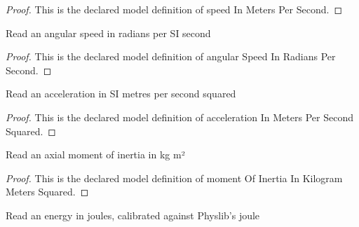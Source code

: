 \begin{proof}
  This is the declared model definition of speed In Meters Per Second.
\end{proof}
\begin{definition}
  \label{def:physics:phyx-mini-0770:phyxminiproblems-problemphyxmini0770-angularspeedinradianspersecond}
  Read an angular speed in radians per SI second
\end{definition}
\begin{proof}
  This is the declared model definition of angular Speed In Radians Per Second.
\end{proof}
\begin{definition}
  \label{def:physics:phyx-mini-0770:phyxminiproblems-problemphyxmini0770-accelerationinmeterspersecondsquared}
  Read an acceleration in SI metres per second squared
\end{definition}
\begin{proof}
  This is the declared model definition of acceleration In Meters Per Second Squared.
\end{proof}
\begin{definition}
  \label{def:physics:phyx-mini-0770:phyxminiproblems-problemphyxmini0770-momentofinertiainkilogrammeterssquared}
  Read an axial moment of inertia in kg m²
\end{definition}
\begin{proof}
  This is the declared model definition of moment Of Inertia In Kilogram Meters Squared.
\end{proof}
\begin{definition}
  \label{def:physics:phyx-mini-0770:phyxminiproblems-problemphyxmini0770-energyinjoules}
  Read an energy in joules, calibrated against Physlib's joule
\end{definition}

